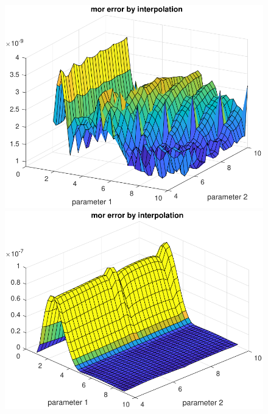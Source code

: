 \begin{figure}[th]
	\begin{minipage}{.5\textwidth}
		\includegraphics[width=1\textwidth]{pdfFIG/morerr_interp.pdf}\\
		\includegraphics[width=1\textwidth]{pdfFIG/morerr_interp3.pdf}
	\end{minipage}%
	\begin{minipage}{.5\textwidth}

\end{minipage}
\end{figure}
